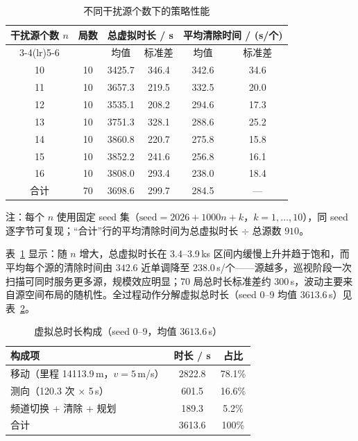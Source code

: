 \documentclass[UTF8, zihao=5,AutoFakeBold=2]{ctexart}
\begin{document}
\begin{table}[H]
    \centering
    \caption{不同干扰源个数下的策略性能}
    \label{tab:t3-sweep}
    \begin{tabular}{cccccc}
        \toprule
        \multirow{2}{*}{干扰源个数 \(n\)} & \multirow{2}{*}{局数} &
            \multicolumn{2}{c}{总虚拟时长 / s} &
            \multicolumn{2}{c}{平均清除时间 / (s/个)} \\
        \cmidrule(lr){3-4}\cmidrule(lr){5-6}
            & & 均值 & 标准差 & 均值 & 标准差 \\
        \midrule
        10 & 10 & 3425.7 & 346.4 & 342.6 & 34.6 \\
        11 & 10 & 3657.3 & 219.5 & 332.5 & 20.0 \\
        12 & 10 & 3535.1 & 208.2 & 294.6 & 17.3 \\
        13 & 10 & 3751.3 & 328.1 & 288.6 & 25.2 \\
        14 & 10 & 3860.8 & 220.7 & 275.8 & 15.8 \\
        15 & 10 & 3852.2 & 241.6 & 256.8 & 16.1 \\
        16 & 10 & 3808.0 & 293.4 & 238.0 & 18.4 \\
        \midrule
        合计 & 70 & 3698.6 & 299.7 & 284.5 & --- \\
        \bottomrule
    \end{tabular}
    \par\smallskip
    \footnotesize{注：每个 \(n\) 使用固定 seed 集（\(\text{seed}=2026+1000n+k\)，\(k=1,\dots,10\)），同 seed 逐字节可复现；“合计”行的平均清除时间为总虚拟时长 \(\div\) 总源数 \(910\)。}
\end{table}

表~\ref{tab:t3-sweep} 显示：随 \(n\) 增大，总虚拟时长在 3.4--3.9\,ks 区间内缓慢上升并趋于饱和，而平均每个源的清除时间由 \(342.6\) 近单调降至 \(238.0\)\,s/个——源越多，巡视阶段一次扫描可同时服务更多源，规模效应明显；70 局总时长标准差约 \(300\)\,s，波动主要来自源空间布局的随机性。全过程动作分解虚拟总时长（seed 0--9 均值 \(3613.6\)\,s）见表~\ref{tab:t3-break}。

\begin{table}[H]
    \centering
    \caption{虚拟总时长构成（seed 0--9，均值 \(3613.6\)\,s）}
    \label{tab:t3-break}
    \begin{tabular}{lcc}
        \toprule
        构成项 & 时长 / s & 占比 \\
        \midrule
        移动（里程 14113.9\,m，\(v=5\)\,m/s） & 2822.8 & 78.1\% \\
        测向（120.3 次 \(\times\) 5\,s） & 601.5 & 16.6\% \\
        频道切换 + 清除 + 规划 & 189.3 & 5.2\% \\
        \midrule
        合计 & 3613.6 & 100\% \\
        \bottomrule
    \end{tabular}
\end{table}
\end{document}
